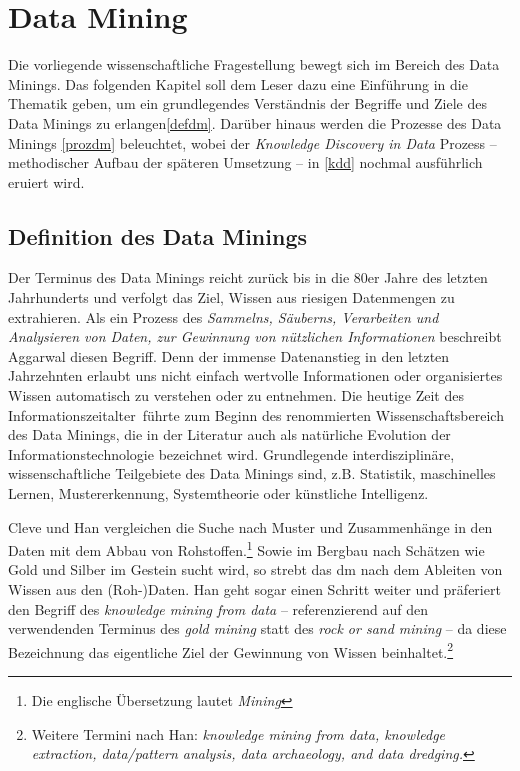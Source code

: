 \section{Data Mining}
\label{dm}
Die vorliegende wissenschaftliche Fragestellung bewegt sich im Bereich des Data Minings. Das folgenden Kapitel soll dem Leser dazu eine Einführung in die Thematik geben, um ein grundlegendes Verständnis der Begriffe und Ziele des Data Minings zu erlangen\vref{defdm}. Darüber hinaus werden die Prozesse des Data Minings \vref{prozdm} beleuchtet, wobei der \textit{Knowledge Discovery in Data} Prozess -- methodischer Aufbau der späteren Umsetzung -- in \vref{kdd} nochmal ausführlich eruiert wird.

\subsection{Definition des Data Minings}
\label{defdm}

Der Terminus des Data Minings reicht zurück bis in die 80er Jahre des letzten Jahrhunderts und verfolgt das Ziel, Wissen aus riesigen Datenmengen zu extrahieren. Als ein Prozess des \textit{Sammelns, Säuberns, Verarbeiten und Analysieren von Daten, zur Gewinnung von nützlichen Informationen} beschreibt Aggarwal diesen Begriff. Denn der immense Datenanstieg in den letzten Jahrzehnten erlaubt uns nicht einfach wertvolle Informationen oder organisiertes Wissen automatisch zu verstehen oder zu entnehmen. Die heutige Zeit des \glqq Informationszeitalter\grqq~führte zum Beginn des renommierten Wissenschaftsbereich des Data Minings, die in der Literatur auch als natürliche Evolution der Informationstechnologie bezeichnet wird. Grundlegende interdisziplinäre, wissenschaftliche Teilgebiete des Data Minings sind, z.B. Statistik, maschinelles Lernen, Mustererkennung, Systemtheorie oder künstliche Intelligenz.


Cleve und Han vergleichen die Suche nach Muster und Zusammenhänge in den Daten mit dem Abbau von Rohstoffen.\footnote{Die englische Übersetzung lautet \textit{\glqq Mining\grqq}} Sowie im Bergbau nach Schätzen wie Gold und Silber im Gestein sucht wird, so strebt das \gls{dm} nach dem Ableiten von Wissen aus den (Roh-)Daten. Han geht sogar einen Schritt weiter und präferiert den Begriff des \textit{knowledge mining from data} -- referenzierend auf den verwendenden Terminus des \textit{gold mining} statt des \textit{rock or sand mining} -- da diese Bezeichnung das eigentliche Ziel der Gewinnung von Wissen beinhaltet.\footnote{Weitere Termini nach Han: \textit{knowledge mining from data, knowledge extraction, data/pattern analysis, data archaeology, and data dredging.}}

